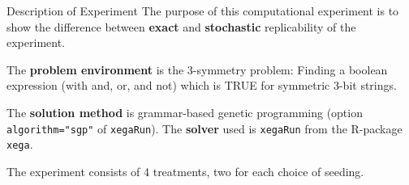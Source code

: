 \begin{frame}
\vspace*{2mm}
\begin{block}{
Description of Experiment
}
The purpose of this computational experiment is to show the difference
between {\bf exact} and {\bf stochastic} replicability of the experiment.
 
The {\bf problem environment} is the 3-symmetry problem: 
Finding a boolean expression (with and, or, and not)
which is TRUE for symmetric 3-bit strings.
 
The {\bf solution method} is grammar-based genetic programming
(option {\tt algorithm="sgp"}  of {\tt xegaRun}).
The {\bf solver} used is {\tt xegaRun} from the R-package {\tt xega}.
 
The experiment consists of 4 treatments, two for each choice of seeding.
\end{block}
\end{frame}